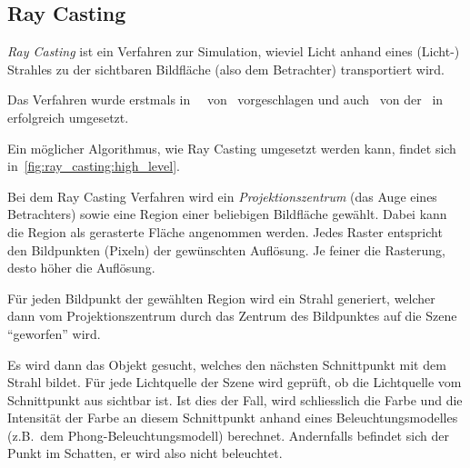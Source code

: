 
\subsection{Ray Casting}
\label{subsec:ray_casting}

\textit{Ray Casting} ist ein Verfahren zur Simulation, wieviel Licht
anhand eines (Licht-) Strahles zu der sichtbaren Bildfläche (also dem
Betrachter) transportiert wird.

Das Verfahren wurde erstmals
in~~\citeyear{appel_techniques_1968}
von~\citeauthor{appel_techniques_1968} vorgeschlagen und
auch~\citeyear{arlington_mathematical_applications_group_inc_afips_1968}
von
der~\citeauthor{arlington_mathematical_applications_group_inc_afips_1968}
in~
erfolgreich umgesetzt.

Ein möglicher Algorithmus, wie Ray Casting umgesetzt werden kann, findet
sich in~\autoref{fig:ray_casting:high_level}.

Bei dem Ray Casting Verfahren wird ein \textit{Projektionszentrum} (das
Auge eines Betrachters) sowie eine Region einer beliebigen Bildfläche
gewählt. Dabei kann die Region als gerasterte Fläche angenommen werden.
Jedes Raster entspricht den Bildpunkten (Pixeln) der gewünschten
Auflösung. Je feiner die Rasterung, desto höher die Auflösung.

Für jeden Bildpunkt der gewählten Region wird ein Strahl generiert,
welcher dann vom Projektionszentrum durch das Zentrum des Bildpunktes
auf die Szene ``geworfen'' wird. 

Es wird dann das Objekt gesucht, welches den nächsten Schnittpunkt mit
dem Strahl bildet. Für jede Lichtquelle der Szene wird geprüft, ob die
Lichtquelle vom Schnittpunkt aus sichtbar ist. Ist dies der Fall, wird
schliesslich die Farbe und die Intensität der Farbe an diesem Schnittpunkt
anhand eines Beleuchtungsmodelles (z.B.\ dem Phong-Beleuchtungsmodell)
berechnet. Andernfalls befindet sich der Punkt im Schatten, er wird also
nicht beleuchtet.

